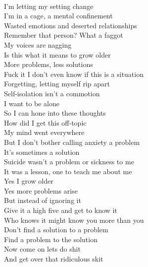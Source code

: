 \documentclass[12pt, b5paper]{article}
\begin{document}
\\I'm letting my setting change
\\I'm in a cage, a mental confinement
\\Wasted emotions and deserted relationships
\\Remember that person? What a faggot
\\My voices are nagging
\\Is this what it means to grow older
\\More problems, less solutions
\\Fuck it I don't even know if this is a situation
\\Forgetting, letting myself rip apart
\\Self-isolation isn't a commotion
\\I want to be alone
\\So I can hone into these thoughts
\\How did I get this off-topic
\\My mind went everywhere
\\But I don't bother calling anxiety a problem
\\It's sometimes a solution
\\Suicide wasn't a problem or sickness to me
\\It was a lesson, one to teach me about me
\\Yes I grow older
\\Yes more problems arise
\\But instead of ignoring it
\\Give it a high five and get to know it
\\Who knows it might know you more than you
\\Don't find a solution to a problem
\\Find a problem to the solution
\\Now come on lets do shit
\\And get over that ridiculous skit 


\newpage 
\end{document}
